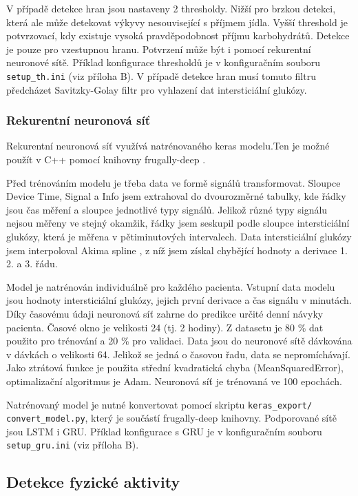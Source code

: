 V případě detekce hran jsou nastaveny 2 thresholdy. Nižší pro brzkou detekci, která ale může detekovat výkyvy nesouvisející s příjmem jídla. Vyšší threshold je potvrzovací, kdy existuje vysoká pravděpodobnost příjmu karbohydrátů. Detekce je pouze pro vzestupnou hranu. Potvrzení může být i pomocí rekurentní neuronové sítě. Příklad konfigurace thresholdů je v konfiguračním souboru \texttt{setup\_th.ini} (viz příloha B). V případě detekce hran musí tomuto filtru předcházet Savitzky-Golay filtr pro vyhlazení dat intersticiální glukózy.

\subsubsection{Rekurentní neuronová síť}

Rekurentní neuronová síť využívá natrénovaného keras modelu.Ten je možné použít v C++ pomocí knihovny frugally-deep \citep{cho.frugally}.

Před trénováním modelu je třeba data ve formě signálů transformovat. Sloupce Device Time, Signal a Info jsem extrahoval do dvourozměrné tabulky, kde řádky jsou čas měření a sloupce jednotlivé typy signálů. Jelikož různé typy signálu nejsou měřeny ve stejný okamžik, řádky jsem seskupil podle sloupce intersticiální glukózy, která je měřena v pětiminutových intervalech. Data intersticiální glukózy jsem interpoloval Akima spline \citep{cho.akima}, z níž jsem získal chybějící hodnoty a derivace 1. 2. a 3. řádu.

Model je natrénován individuálně pro každého pacienta. Vstupní data modelu jsou hodnoty intersticiální glukózy, jejich první derivace a čas signálu v minutách. Díky časovému údaji neuronová síť zahrne do predikce určité denní návyky pacienta. Časové okno je velikosti 24 (tj. 2 hodiny). Z datasetu je 80 \% dat použito pro trénování a 20 \% pro validaci. Data jsou do neuronové sítě dávkována v dávkách o velikosti 64. Jelikož se jedná o časovou řadu, data se nepromíchávají. Jako ztrátová funkce je použita střední kvadratická chyba (MeanSquaredError), optimalizační algoritmus je Adam. Neuronová síť je trénovaná ve 100 epochách. 



Natrénovaný model je nutné konvertovat pomocí skriptu \texttt{keras\_export/ convert\_model.py}, který je součástí frugally-deep knihovny. Podporované sítě jsou LSTM i GRU. Příklad konfigurace s GRU je v konfiguračním souboru \texttt{setup\_gru.ini} (viz příloha B).


\subsection{Detekce fyzické aktivity}